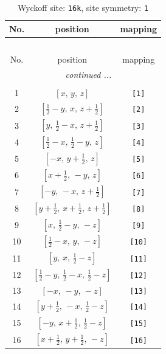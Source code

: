 \documentclass[fleqn,8pt]{jsarticle}
\begin{document}
\begin{longtable}{ccc}
\caption{Wyckoff site: {\tt 16k}, site symmetry: {\tt 1}}
 \\
 \hline \hline
No. & position & mapping \\ \hline \endfirsthead

\multicolumn{2}{l}{\tablename\ \thetable{}} \\
 \hline \hline
No. & position & mapping \\ \hline \endhead

 \hline \hline
\multicolumn{2}{r}{\footnotesize\it continued ...} \\ \endfoot

 \hline \hline
\multicolumn{2}{r}{} \\ \endlastfoot

1 & $\left[ x,\, y,\, z \right]$ & {\tt [1]} \\ \hline
2 & $\left[ \frac{1}{2} - y,\, x,\, z + \frac{1}{2} \right]$ & {\tt [2]} \\ \hline
3 & $\left[ y,\, \frac{1}{2} - x,\, z + \frac{1}{2} \right]$ & {\tt [3]} \\ \hline
4 & $\left[ \frac{1}{2} - x,\, \frac{1}{2} - y,\, z \right]$ & {\tt [4]} \\ \hline
5 & $\left[ - x,\, y + \frac{1}{2},\, z \right]$ & {\tt [5]} \\ \hline
6 & $\left[ x + \frac{1}{2},\, - y,\, z \right]$ & {\tt [6]} \\ \hline
7 & $\left[ - y,\, - x,\, z + \frac{1}{2} \right]$ & {\tt [7]} \\ \hline
8 & $\left[ y + \frac{1}{2},\, x + \frac{1}{2},\, z + \frac{1}{2} \right]$ & {\tt [8]} \\ \hline
9 & $\left[ x,\, \frac{1}{2} - y,\, - z \right]$ & {\tt [9]} \\ \hline
10 & $\left[ \frac{1}{2} - x,\, y,\, - z \right]$ & {\tt [10]} \\ \hline
11 & $\left[ y,\, x,\, \frac{1}{2} - z \right]$ & {\tt [11]} \\ \hline
12 & $\left[ \frac{1}{2} - y,\, \frac{1}{2} - x,\, \frac{1}{2} - z \right]$ & {\tt [12]} \\ \hline
13 & $\left[ - x,\, - y,\, - z \right]$ & {\tt [13]} \\ \hline
14 & $\left[ y + \frac{1}{2},\, - x,\, \frac{1}{2} - z \right]$ & {\tt [14]} \\ \hline
15 & $\left[ - y,\, x + \frac{1}{2},\, \frac{1}{2} - z \right]$ & {\tt [15]} \\ \hline
16 & $\left[ x + \frac{1}{2},\, y + \frac{1}{2},\, - z \right]$ & {\tt [16]} \\
\end{longtable}
\end{document}
